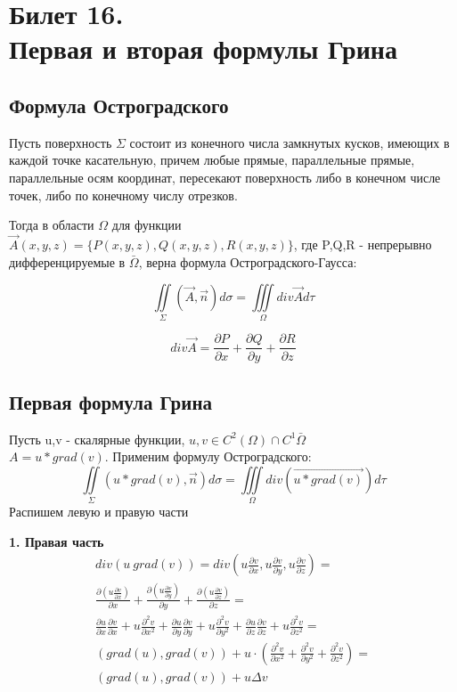 \documentclass[11pt,a4paper]{article}
\title{}
\date{}
\begin{document}
\section{Билет 16.\\ Первая и вторая формулы Грина}
\subsection{Формула Остроградского}
	
Пусть поверхность $\varSigma$ состоит из конечного числа замкнутых кусков, имеющих в каждой точке касательную, причем любые прямые, параллельные прямые, параллельные осям координат, пересекают поверхность либо в конечном числе точек, либо по конечному числу отрезков.

Тогда в области $\varOmega$ для функции $\vec{A}(x,y,z) = \{P(x,y,z), Q(x,y,z), R(x,y,z)\}$, где P,Q,R - непрерывно дифференцируемые в $\bar{\varOmega}$, верна формула Остроградского-Гаусса:

$$
\iint \limits_{\varSigma} (\vec{A}, \vec{n})d\sigma = \iiint \limits_{\varOmega} div \vec{A} d\tau
$$

$$
div \vec{A} = \frac{\partial P}{\partial x} + \frac{\partial Q}{\partial y} + \frac{\partial R}{\partial z}
$$

\subsection{Первая формула Грина}
Пусть u,v - скалярные функции, $u,v \in C^2(\varOmega) \cap C^1{\bar{\varOmega}} $\\
$A = u * grad (v)$. Применим формулу Остроградского:
$$
\iint \limits_{\varSigma} (u * grad(v), \vec{n})d\sigma = \iiint \limits_{\varOmega} div (\vec{u * grad(v)}) d\tau
$$
Распишем левую и правую части

\textbf{1. Правая часть} \\
\begin{equation}
\begin{split}
div(u\ grad(v)) = div(u\frac{\partial v}{\partial x}, u\frac{\partial v}{\partial y}, u\frac{\partial v}{\partial z}) = \\
\frac{\partial(u\frac{\partial v}{\partial x})}{\partial x} + 
\frac{\partial(u\frac{\partial v}{\partial y})}{\partial y} +
\frac{\partial(u\frac{\partial v}{\partial z})}{\partial z} = \\
\frac{\partial u}{\partial x} \frac{\partial v}{\partial x} + 
u \frac{\partial^2 v}{\partial x^2} + 
\frac{\partial u}{\partial y} \frac{\partial v}{\partial y} + 
u \frac{\partial^2 v}{\partial y^2} + 
\frac{\partial u}{\partial z} \frac{\partial v}{\partial z} + 
u \frac{\partial^2 v}{\partial z^2} = \\
(grad(u), grad(v)) + u \cdot (
\frac{\partial^2 v}{\partial x^2} +
\frac{\partial^2 v}{\partial y^2} +
\frac{\partial^2 v}{\partial z^2}
) = \\
(grad(u), grad(v)) + u \Delta v
\end{split}
\end{equation}
\end{document}
